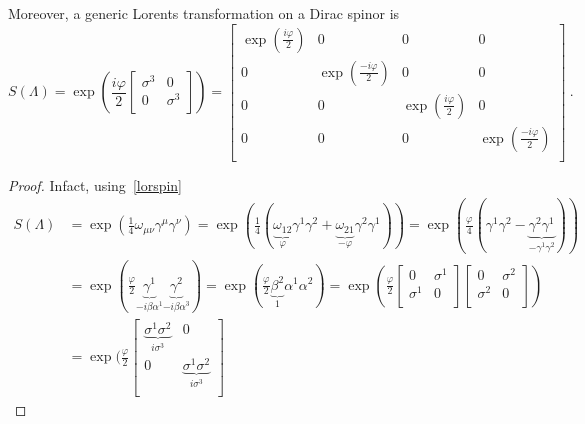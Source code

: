 \begin{example}
        Moreover, a generic Lorents transformation on a Dirac spinor is 
        \begin{equation*}
            S(\Lambda) = \exp(\frac{i \varphi}{2} \begin{bmatrix}
                \sigma^3 & 0 \\ 0 & \sigma^3 \\
            \end{bmatrix}) = \begin{bmatrix}
                \exp(\frac{i \varphi}{2}) & 0 & 0 & 0 \\ 
                0 & \exp(\frac{-i \varphi}{2}) & 0 & 0 \\ 
                0 & 0 & \exp(\frac{i \varphi}{2}) & 0 \\ 
                0 & 0 & 0 & \exp(\frac{-i \varphi}{2}) \\
            \end{bmatrix} ~.
        \end{equation*}
        \begin{proof}
            Infact, using~\eqref{lorspin}
            \begin{equation*}
            \begin{aligned}
                S(\Lambda) & = \exp(\frac{1}{4} \omega_{\mu\nu} \gamma^\mu \gamma^\nu) = \exp(\frac{1}{4} (\underbrace{\omega_{12}}_\varphi \gamma^1 \gamma^2 + \underbrace{\omega_{21}}_{-\varphi} \gamma^2 \gamma^1 )) = \exp(\frac{\varphi}{4} (\gamma^1 \gamma^2 - \underbrace{\gamma^2 \gamma^1}_{- \gamma^1 \gamma^2} )) \\ & = \exp(\frac{\varphi}{2} \underbrace{\gamma^1}_{-i \beta \alpha^1} \underbrace{\gamma^2}_{- i \beta \alpha^3}) = \exp(\frac{\varphi}{2} \underbrace{\beta^2}_1 \alpha^1 \alpha^2) = \exp(\frac{\varphi}{2} \begin{bmatrix}
                    0 & \sigma^1 \\ \sigma^1 & 0 \\
                \end{bmatrix} \begin{bmatrix}
                    0 & \sigma^2 \\ \sigma^2 & 0 \\
                \end{bmatrix}) \\ & = \exp(\frac{\varphi}{2} \begin{bmatrix}
                    \underbrace{\sigma^1 \sigma^2}_{i \sigma^3} & 0 \\ 0 & \underbrace{\sigma^1 \sigma^2}_{i \sigma^3} \\

\end{bmatrix}
\end{aligned}
\end{equation*}
\end{proof}
\end{example}
